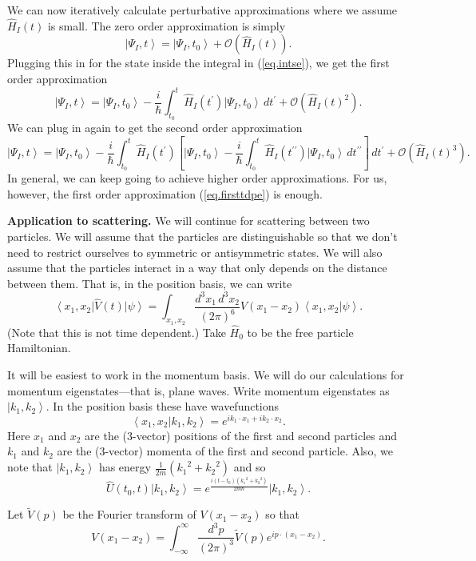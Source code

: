 \documentclass[11pt]{article}
\newcommand{\Od}[1]{\mathcal{O}{\left(#1\right)}}
\newcommand{\bra}[1]{\left\langle#1\right|}
\newcommand{\ket}[1]{\left|#1\right\rangle}
\newcommand{\braket}[2]{\left\langle#1|#2\right\rangle}
\newcommand{\op}[1]{\hat{#1}}
\theoremstyle{theorem}
\theoremstyle{remark}
\theoremstyle{step}
\theoremstyle{gap}
\begin{document}
We can now iteratively calculate perturbative approximations where we assume \(\op{H}_I(t)\) is small. The zero order approximation is simply
\[\ket{\Psi_I, t} = \ket{\Psi_I, t_0} + \Od{\op{H}_I(t)}.\]
Plugging this in for the state inside the integral in (\ref{eq.intse}), we get the first order approximation
\begin{equation}\label{eq.firsttdpe}
\ket{\Psi_I, t} = \ket{\Psi_I, t_0} - \frac{i}{\hbar} \int_{t_0}^t \op{H}_I(t^\prime)\ket{\Psi_I, t_0} \,dt^\prime + \Od{\op{H}_I(t)^2}.
\end{equation}
We can plug in again to get the second order approximation
\[
\ket{\Psi_I, t} = \ket{\Psi_I, t_0} - \frac{i}{\hbar} \int_{t_0}^t \op{H}_I(t^\prime)\left[\ket{\Psi_I, t_0} - \frac{i}{\hbar} \int_{t_0}^t \op{H}_I(t^{\prime\prime})\ket{\Psi_I, t_0} \,dt^{\prime\prime}\right] \,dt^\prime + \Od{\op{H}_I(t)^3}.
\]
In general, we can keep going to achieve higher order approximations. For us, however, the first order approximation (\ref{eq.firsttdpe}) is enough.

{\bf Application to scattering.} We will continue for scattering between two particles. We will assume that the particles are distinguishable so that we don't need to restrict ourselves to symmetric or antisymmetric states. We will also assume that the particles interact in a way that only depends on the distance between them. That is, in the position basis, we can write \[\bra{x_1, x_2}\op{V}(t)\ket{\psi} = \int_{x_1,x_2} \frac{d^3 x_1 \,d^3x_2}{(2\pi)^6} V(x_1 - x_2) \braket{x_1, x_2}{\psi}.\] (Note that this is not time dependent.) Take \(\op{H}_0\) to be the free particle Hamiltonian.

It will be easiest to work in the momentum basis. We will do our calculations for momentum eigenstates---that is, plane waves. Write momentum eigenstates as \(\ket{k_1, k_2}\). In the position basis these have wavefunctions
\[\braket{x_1, x_2}{k_1, k_2} = e^{ik_1\cdot x_1 + ik_2\cdot x_2}.\]
Here \(x_1\) and \(x_2\) are the (3-vector) positions of the first and second particles and \(k_1\) and \(k_2\) are the (3-vector) momenta of the first and second particle. Also, we note that \(\ket{k_1, k_2}\) has energy \(\frac{1}{2m} \left({k_1}^2 + {k_2}^2\right)\) and so
\begin{equation}
\label{eq.timeevonk}
\op{U}(t_0, t) \ket{k_1, k_2} = e^{\frac{i\left(t-t_0\right)\left({k_1}^2 + {k_2}^2\right)}{2m\hbar}} \ket{k_1, k_2}.
\end{equation}

Let \(\widetilde{V}(p)\) be the Fourier transform of \(V(x_1 - x_2)\) so that
\begin{equation}
\label{eq.ftV}
V(x_1 - x_2) = \int_{-\infty}^{\infty} \frac{d^3 p}{(2 \pi)^3} \widetilde{V}(p) e^{ip\cdot(x_1 - x_2)}.
\end{equation}
\end{document}
